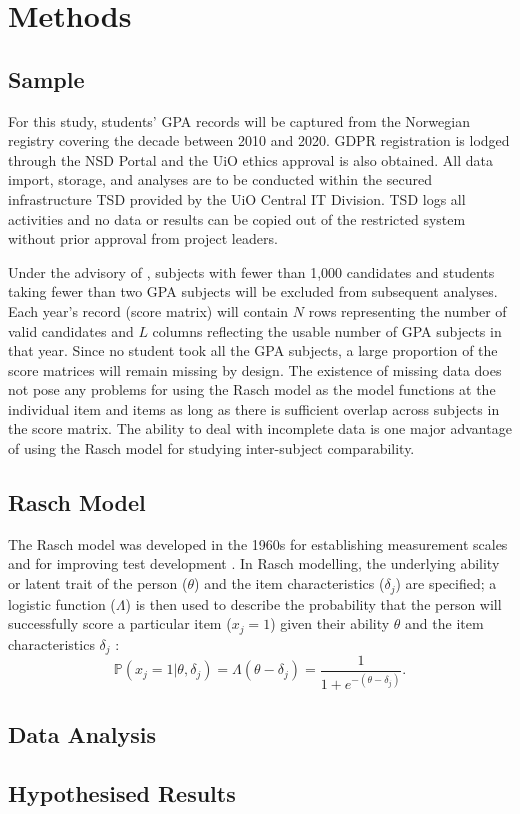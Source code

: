 \documentclass[
    a4paper,            %
    11pt,               %
    stu,                %
    donotrepeattitle,   %
    noextraspace,       %
    floatsintext,       %
    biblatex,           %
    colorlinks=true,        %
    linkcolor=red,          %
    anchorcolor=black,      %
    citecolor=blue,         %
    urlcolor=blue,          %
    bookmarks=true,         %
    bookmarksopen=false,    %
    bookmarksnumbered=true  %
]{apa7}
\begin{document}
\section{Methods}

\subsection{Sample}

For this study, students' GPA records will be captured from the Norwegian registry covering the decade between 2010 and 2020. GDPR registration is lodged through the NSD Portal and the UiO ethics approval is also obtained. All data import, storage, and analyses are to be conducted within the secured infrastructure TSD provided by the UiO Central IT Division. TSD logs all activities and no data or results can be copied out of the restricted system without prior approval from project leaders.

Under the advisory of \textcite{he:2015}, subjects with fewer than 1,000 candidates and students taking fewer than two GPA subjects will be excluded from subsequent analyses. Each year's record (score matrix) will contain $N$ rows representing the number of valid candidates and $L$ columns reflecting the usable number of GPA subjects in that year. Since no student took all the GPA subjects, a large proportion of the score matrices will remain missing by design. The existence of missing data does not pose any problems for using the Rasch model as the model functions at the individual item and items as long as there is sufficient overlap across subjects in the score matrix. The ability to deal with incomplete data is one major advantage of using the Rasch model for studying inter-subject comparability.

\subsection{Rasch Model}

The Rasch model was developed in the 1960s for establishing measurement scales and for improving test development \parencite{rasch:1980}. In Rasch modelling, the underlying ability or latent trait of the person ($\theta$) and the item characteristics ($\delta_j$) are specified; a logistic function ($\Lambda$) is then used to describe the probability that the person will successfully score a particular item ($x_j=1$) given their ability $\theta$ and the item characteristics $\delta_j$ \parencite{deayala:2009}:
\begin{equation}
    \mathbb{P} \left( x_j=1 | \theta, \delta_j \right) = \Lambda(\theta - \delta_j) = \frac{1}{1 + e^{- \left( \theta - \delta_j \right) } }.
\end{equation}



\subsection{Data Analysis}


\subsection{Hypothesised Results}











\printbibliography
\end{document}
